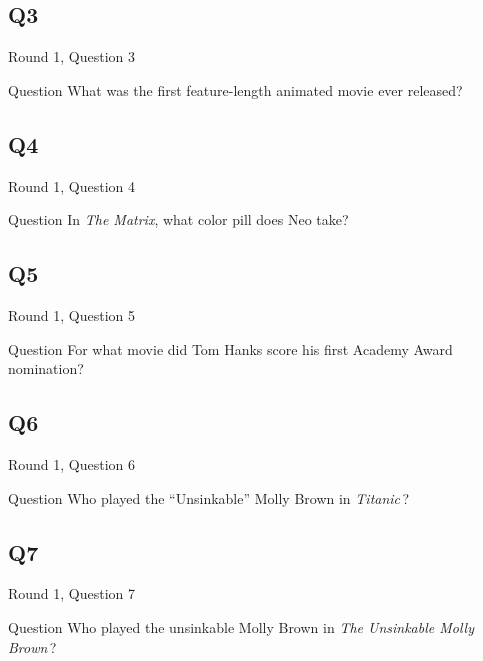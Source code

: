\documentclass[11pt]{beamer}
\begin{document}
\subsection*{Q3}
\begin{frame}[t]{Round 1, Question 3}
\vspace{2em}
\begin{block}{Question}
What was the first feature-length animated movie ever released?
\end{block}
\end{frame}
    

\subsection*{Q4}
\begin{frame}[t]{Round 1, Question 4}
\vspace{2em}
\begin{block}{Question}
In \emph{The Matrix}, what color pill does Neo take?
\end{block}
\end{frame}
    

\subsection*{Q5}
\begin{frame}[t]{Round 1, Question 5}
\vspace{2em}
\begin{block}{Question}
For what movie did Tom Hanks score his first Academy Award nomination?
\end{block}
\end{frame}
    

\subsection*{Q6}
\begin{frame}[t]{Round 1, Question 6}
\vspace{2em}
\begin{block}{Question}
Who played the ``Unsinkable'' Molly Brown in \emph{Titanic}\,?
\end{block}
\end{frame}
    

\subsection*{Q7}
\begin{frame}[t]{Round 1, Question 7}
\vspace{2em}
\begin{block}{Question}
Who played the unsinkable Molly Brown in \emph{The Unsinkable Molly Brown}\,?
\end{block}
\end{frame}
    
\end{document}
